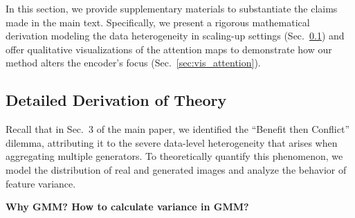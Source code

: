 In this section, we provide supplementary materials to substantiate the claims made in the main text. Specifically, we present a rigorous mathematical derivation modeling the data heterogeneity in scaling-up settings (Sec.~\ref{sec:theory_derivation}) and offer qualitative visualizations of the attention maps to demonstrate how our method alters the encoder's focus (Sec.~\ref{sec:vis_attention}).

\subsection{Detailed Derivation of Theory}
\label{sec:theory_derivation}

Recall that in Sec.~3 of the main paper, we identified the ``Benefit then Conflict'' dilemma, attributing it to the severe data-level heterogeneity that arises when aggregating multiple generators. To theoretically quantify this phenomenon, we model the distribution of real and generated images and analyze the behavior of feature variance.

\textbf{Why GMM? How to calculate variance in GMM?}

